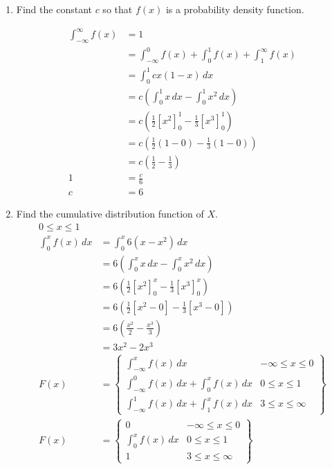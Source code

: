 \documentclass{article}
\begin{document}
\begin{enumerate}[\quad(a)]
	\item Find the constant $c$ so that $f(x)$ is a probability density function.
	
	\begin{align*}
		\int_{-\infty}^{\infty} f(x) &=1 \\
		&= \int_{-\infty}^{0} f(x) + \int_{0}^{1} f(x) + \int_{1}^{\infty} f(x)\\
		&= \int_0^1 cx(1-x) \, dx \\
		&= c\left(\int_0^1 x \, dx - \int_0^1 x^2 \, dx\right)\\
		&= c\left(\tfrac{1}{2} [x^2]_0^1 - \tfrac{1}{3} [x^3]_0^1\right)\\
		&= c\left(\tfrac{1}{2} (1-0) - \tfrac{1}{3} (1-0) \right)\\
		&= c\left(\tfrac{1}{2} - \tfrac{1}{3} \right)\\
		1&= \tfrac{c}{6}\\
		c&= 6
	\end{align*}
	\item Find the cumulative distribution function of $X$.
	\begin{align*}
		0 \leq x \leq 1\\
		\int_0^x f(x) \, dx &= \int_0^x 6\left(x-x^2\right) \, dx\\
		&= 6\left( \int_0^x x\, dx - \int_0^x x^2 \, dx \right)\\
		&= 6\left( \tfrac{1}{2} [x^2]_0^x - \tfrac{1}{3} [x^3]_0^x\right)\\
		&= 6\left( \tfrac{1}{2}[x^2-0] - \tfrac{1}{3}[x^3-0]\right)\\
		&= 6\left( \frac{x^2}{2} - \frac{x^3}{3}\right)\\
		&= 3x^2 - 2x^3\\
		F(x) &= \left\{
		\begin{array}{ll}
			\int_{-\infty}^{x} f(x) \, dx & -\infty \le x \leq 0 \\
			\int_{-\infty}^{0} f(x) \, dx + \int_{0}^{x} f(x) \, dx  & 0 \le x \le 1\\
			\int_{-\infty}^{1} f(x) \, dx + \int_{1}^{x} f(x) \, dx & 3 \le x \le \infty
		\end{array} \right\} \\
		F(x) &= \left\{
		\begin{array}{ll}
		0 & -\infty \le x \leq 0 \\
		\int_{0}^{x} f(x) \, dx  & 0 \le x \le 1\\
		1 & 3 \le x \le \infty
		\end{array} \right\} \\

\end{align*}
\end{enumerate}
\end{document}
